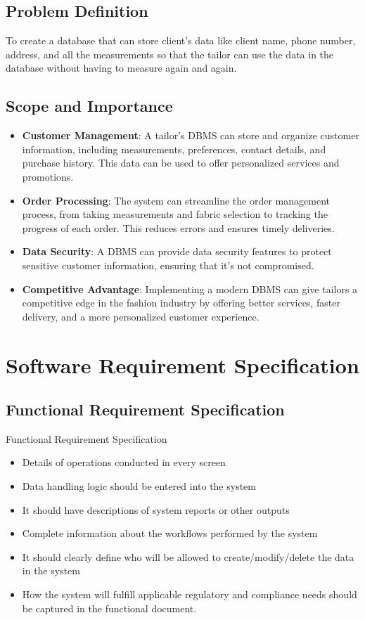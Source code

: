 \documentclass[12pt, letter paper]{report}
\begin{document}
\section{Problem Definition} 
To create a database that can store client’s data like client name, phone number, address, and all the measurements so that the tailor can use the data in the database without having to measure again and again.

\section{Scope and Importance}
\begin{itemize}
\item \textbf{Customer Management}: A tailor's DBMS can store and organize customer information, including measurements, preferences, contact details, and purchase history. This data can be used to offer personalized services and promotions.
\item \textbf{Order Processing}: The system can streamline the order management process, from taking measurements and fabric selection to tracking the progress of each order. This reduces errors and ensures timely deliveries.
\item \textbf{Data Security}: A DBMS can provide data security features to protect sensitive customer information, ensuring that it's not compromised.
\item \textbf{Competitive Advantage}: Implementing a modern DBMS can give tailors a competitive edge in the fashion industry by offering better services, faster delivery, and a more personalized customer experience.
\end{itemize}
\chapter{Software Requirement Specification}

\section{Functional Requirement Specification} 
Functional  Requirement Specification
\begin{itemize}
\item Details of operations conducted in every screen
\item Data handling logic should be entered into the system
\item It should have descriptions of system reports or other outputs
\item Complete information about the workflows performed by the system
\item It should clearly define who will be allowed to create/modify/delete the data in the system
\item How the system will fulfill applicable regulatory and compliance needs should be captured in the functional document.
\end{itemize}
\end{document}
